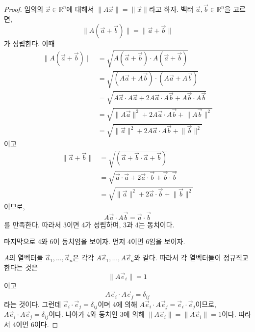 \documentclass[../engineering_mathematics_lecture_note.tex]{subfiles}
\begin{document}
\begin{proof}
    임의의 $\vec x \in \mathbb R^n$에 대해서 $\lVert A \vec x \rVert = \lVert \vec x \rVert$라고 하자.
    벡터 $\vec a, \vec b \in \mathbb R^n$을 고르면,
    \begin{equation*}
        \lVert A (\vec a + \vec b) \rVert = \lVert \vec a + \vec b \rVert
    \end{equation*}
    가 성립한다.
    이때
    \begin{align*}
        \lVert A (\vec a + \vec b) \rVert &= \sqrt{A (\vec a + \vec b) \cdot A (\vec a + \vec b) }\\
                                          &= \sqrt{(A \vec a + A \vec b) \cdot (A \vec a + A \vec b)}\\
                                          &= \sqrt{A \vec a \cdot A \vec a + 2A \vec a \cdot A \vec b + A \vec b \cdot A \vec b}\\
                                          &= \sqrt{\lVert A \vec a \rVert^2 + 2A \vec a \cdot A \vec b + \lVert A \vec b \rVert^2}\\
                                          &= \sqrt{\lVert \vec a \rVert^2 + 2A \vec a \cdot A \vec b + \lVert \vec b \rVert^2}
    \end{align*}
    이고
    \begin{align*}
        \lVert \vec a + \vec b \rVert &= \sqrt{(\vec a + \vec b \cdot \vec a + \vec b)}\\
                                      &= \sqrt{\vec a \cdot \vec a + 2 \vec a \cdot \vec b + \vec b \cdot \vec b}\\
                                      &= \sqrt{\lVert \vec a \rVert^2 + 2 \vec a \cdot \vec b + \lVert \vec b \rVert^2}
    \end{align*}
    이므로,
    \begin{equation*}
        A \vec a \cdot A \vec b = \vec a \cdot \vec b
    \end{equation*}
    를 만족한다.
    따라서 3이면 4가 성립하며, 3과 4는 동치이다.

    마지막으로 4와 6이 동치임을 보이자. 먼저 4이면 6임을 보이자.

    $A$의 열벡터들 $\vec a_1, \dots, \vec a_n$은 각각 $A \vec e_1, \dots, A \vec e_n$와 같다.
    따라서 각 열벡터들이 정규직교한다는 것은
    \begin{equation*}
        \lVert A \vec e_i \rVert = 1
    \end{equation*}
    이고
    \begin{equation*}
        A \vec e_i \cdot A \vec e_j = \delta_{ij}
    \end{equation*}
    라는 것이다.
    그런데 $\vec e_i \cdot \vec e_j = \delta_{ij}$이며 4에 의해 $A \vec e_i \cdot A \vec e_j = \vec e_i \cdot \vec e_j$이므로, $A \vec e_i \cdot A \vec e_j = \delta_{ij}$이다.
    나아가 4와 동치인 3에 의해 $\lVert A \vec e_i\rVert = \lVert A \vec e_i \rVert = 1$이다.
    따라서 4이면 6이다.


\end{proof}
\end{document}
